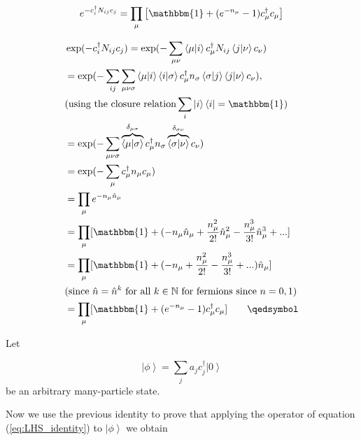 \begin{equation}\label{eq:LHS_identity}
e^{-c_i^\dagger N_{ij} c_j} = \prod_\mu \big[ \mathbbm{1} + ( e^{-n_\mu} - 1 ) c_\mu^\dagger c_\mu \big]
\end{equation}

\begin{equation*}
\begin{split}
&\exp({-c_i^\dagger N_{ij} c_j}) = \exp({ - \sum_{\mu\nu} \left\langle \mu | i \right\rangle c_\mu^\dagger N_{ij} \left\langle j | \nu \right\rangle c_\nu }) \\
&= \exp({-\sum_{ij}\sum_{ \mu\nu\sigma} \left\langle \mu | i \right\rangle  \left\langle i | \sigma \right\rangle c_\mu^\dagger n_\sigma \left\langle \sigma | j \right\rangle \left\langle j | \nu \right\rangle c_\nu }) , \\
& \text{(using the closure relation} \sum_i \left| i \right\rangle \left\langle i \right|= \mathbbm{1} \text{)} \\
&= \exp({-\sum_{ \mu\nu\sigma} \overbrace{\left\langle \mu | \sigma \right\rangle}^{\delta_{\mu\sigma}}  c_\mu^\dagger n_\sigma \overbrace{\left\langle \sigma | \nu \right\rangle}^{\delta_{\sigma\nu}} c_\nu }) \\
&= \exp({-\sum_\mu c_\mu^\dagger n_\mu c_\mu}) \\
&= \prod_\mu e^{-n_\mu \hat{n}_\mu} \\
&= \prod_\mu [ \mathbbm{1} + ( - n_\mu \hat{n}_\mu + \frac{n_\mu^2}{2!} \hat{n}_\mu^2 - \frac{n_\mu^3}{3!} \hat{n}_\mu^3 + ... ] \\
&= \prod_\mu [ \mathbbm{1} + ( - n_\mu + \frac{n_\mu^2}{2!} - \frac{n_\mu^3}{3!} + ... ) \hat{n}_\mu ] \\
& \text{(since  } \hat{n} = \hat{n}^k \text{  for all  } k \in \mathbb{N} \text{  for fermions since  } n = 0, 1 ) \\
&= \prod_\mu [ \mathbbm{1} + ( e^{-n_\mu} - 1 ) c_\mu^\dagger c_\mu ] \quad\quad \qedsymbol
\end{split}
\end{equation*}

Let

\begin{equation}
\left| \phi \right\rangle = \sum_j a_j c_j^\dagger \left| 0 \right\rangle
\end{equation}
be an arbitrary many-particle state. 

Now we use the previous identity to prove that applying the operator of equation (\ref{eq:LHS_identity}) to $\left| \phi \right\rangle$ we obtain

